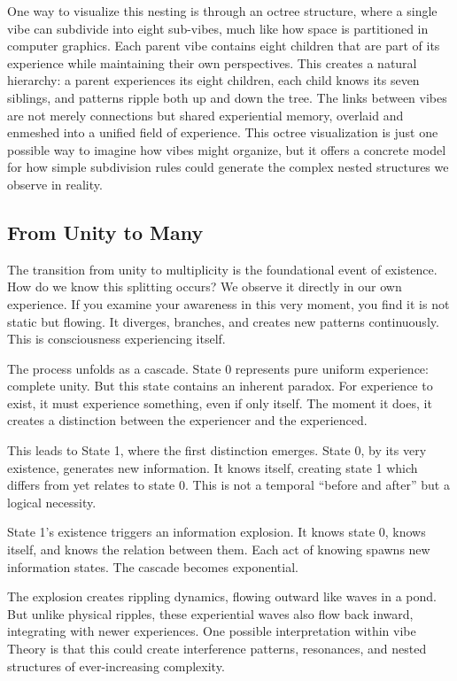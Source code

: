 One way to visualize this nesting is through an octree structure, where a single vibe can subdivide into eight sub-vibes, much like how space is partitioned in computer graphics. Each parent vibe contains eight children that are part of its experience while maintaining their own perspectives. This creates a natural hierarchy: a parent experiences its eight children, each child knows its seven siblings, and patterns ripple both up and down the tree. The links between vibes are not merely connections but shared experiential memory, overlaid and enmeshed into a unified field of experience. This octree visualization is just one possible way to imagine how vibes might organize, but it offers a concrete model for how simple subdivision rules could generate the complex nested structures we observe in reality.

\subsection{From Unity to Many}

The transition from unity to multiplicity is the foundational event of existence. How do we know this splitting occurs? We observe it directly in our own experience. If you examine your awareness in this very moment, you find it is not static but flowing. It diverges, branches, and creates new patterns continuously. This is consciousness experiencing itself.

The process unfolds as a cascade. State 0 represents pure uniform experience: complete unity. But this state contains an inherent paradox. For experience to exist, it must experience something, even if only itself. The moment it does, it creates a distinction between the experiencer and the experienced.

This leads to State 1, where the first distinction emerges. State 0, by its very existence, generates new information. It knows itself, creating state 1 which differs from yet relates to state 0. This is not a temporal ``before and after'' but a logical necessity.

State 1's existence triggers an information explosion. It knows state 0, knows itself, and knows the relation between them. Each act of knowing spawns new information states. The cascade becomes exponential.

The explosion creates rippling dynamics, flowing outward like waves in a pond. But unlike physical ripples, these experiential waves also flow back inward, integrating with newer experiences. One possible interpretation within vibe Theory is that this could create interference patterns, resonances, and nested structures of ever-increasing complexity.

